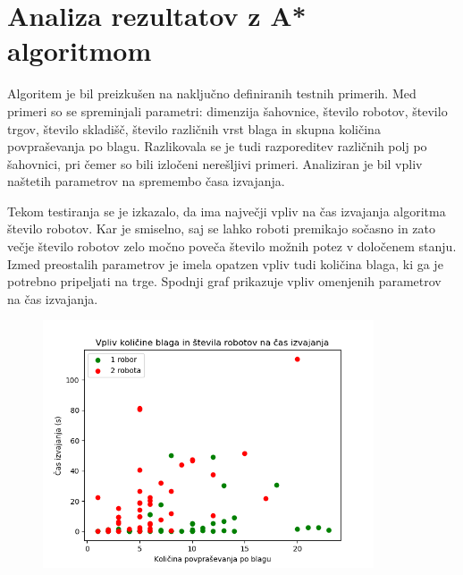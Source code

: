 \documentclass[a4paper,12pt]{article} %
\begin{document}
\section{Analiza rezultatov z A* algoritmom}

Algoritem je bil preizkušen na naključno definiranih testnih primerih. Med primeri so se spreminjali parametri: dimenzija šahovnice, število robotov, število trgov, število skladišč, število različnih vrst blaga in skupna količina povpraševanja po blagu. Razlikovala se je tudi razporeditev različnih polj po šahovnici, pri čemer so bili izločeni nerešljivi primeri. Analiziran je bil vpliv naštetih parametrov na spremembo časa izvajanja.

Tekom testiranja se je izkazalo, da ima največji vpliv na čas izvajanja algoritma število robotov. Kar je smiselno, saj se lahko roboti premikajo sočasno in zato večje število robotov zelo močno  poveča število možnih potez v določenem stanju. Izmed preostalih parametrov je imela opatzen vpliv tudi količina blaga, ki ga je potrebno pripeljati na trge. Spodnji graf prikazuje vpliv omenjenih parametrov na čas izvajanja.

\begin{figure}[H]
\begin{center}
\includegraphics[width=9.8cm]{cas_izvajanja.png}
\end{center}
\end{figure} 
\end{document}
